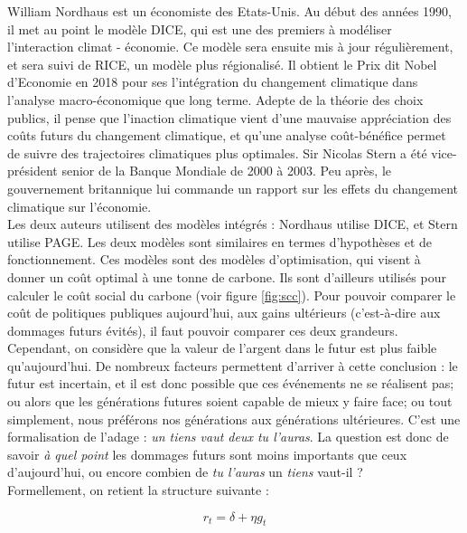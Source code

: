 William Nordhaus est un économiste des Etats-Unis. Au début des années 1990, il met au point le modèle DICE, qui est une des premiers à modéliser l'interaction climat - économie. Ce modèle sera ensuite mis à jour régulièrement, et sera suivi de RICE, un modèle plus régionalisé. Il obtient le Prix dit Nobel d'Economie en 2018 pour ses l'intégration du changement climatique dans l'analyse macro-économique que long terme\cite{yale}. Adepte de la théorie des choix publics, il pense que l'inaction climatique vient d'une mauvaise appréciation des coûts futurs du changement climatique, et qu'une analyse coût-bénéfice permet de suivre des trajectoires climatiques plus optimales. 
Sir Nicolas Stern a été vice-président senior de la Banque Mondiale de 2000 à 2003. Peu après, le gouvernement britannique lui commande un rapport sur les effets du changement climatique sur l'économie. \\

Les deux auteurs utilisent des modèles intégrés : Nordhaus utilise DICE, et Stern utilise PAGE. Les deux modèles sont similaires en termes d'hypothèses et de fonctionnement. Ces modèles sont des modèles d'optimisation, qui visent à donner un coût optimal à une tonne de carbone. Ils sont d'ailleurs utilisés pour calculer le coût social du carbone (voir figure \ref{fig:scc}). Pour pouvoir comparer le coût de politiques publiques aujourd'hui, aux gains ultérieurs (c'est-à-dire aux dommages futurs évités), il faut pouvoir comparer ces deux grandeurs. \\

Cependant, on considère que la valeur de l'argent dans le futur est plus faible qu'aujourd'hui. De nombreux facteurs permettent d'arriver à cette conclusion : le futur est incertain, et il est donc possible que ces événements ne se réalisent pas; ou alors que les générations futures soient capable de mieux y faire face; ou tout simplement, nous préférons nos générations aux générations ultérieures. C'est une formalisation de l'adage : \emph{un tiens vaut deux tu l'auras}. La question est donc de savoir \emph{à quel point} les dommages futurs sont moins importants que ceux d'aujourd'hui, ou encore combien de \emph{tu l'auras} un \emph{tiens} vaut-il ? \\

Formellement, on retient la structure suivante : 

\begin{equation}
    r_t = \delta + \eta g_t 
    \label{eq:disc_rate}
\end{equation}

